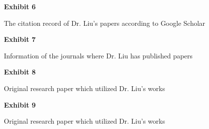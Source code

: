 \documentclass{article}
\begin{document}



\vspace*{\fill}

\begin{center}

{\LARGE \bf
Exhibit 6
}

\vspace{10\baselineskip}

{\large The citation record of Dr. Liu’s papers according to Google Scholar}

\end{center}
\vspace*{\fill}



\vspace*{\fill}

\begin{center}

{\LARGE \bf
Exhibit 7
}

\vspace{10\baselineskip}

{\large Information of the journals where Dr. Liu has published papers }

\end{center}
\vspace*{\fill}



\vspace*{\fill}

\begin{center}

{\LARGE \bf
Exhibit 8
}

\vspace{10\baselineskip}

{\large Original research paper which utilized Dr. Liu’s works}

\end{center}
\vspace*{\fill}



\vspace*{\fill}

\begin{center}

{\LARGE \bf
Exhibit 9
}

\vspace{10\baselineskip}

{\large Original research paper which utilized Dr. Liu’s works}

\end{center}
\vspace*{\fill}
\end{document}
